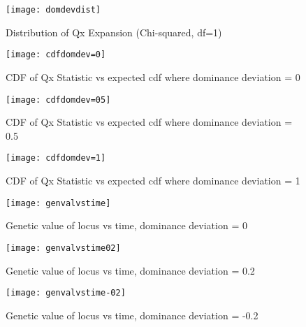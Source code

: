 \documentclass[a4paper,10pt]{article}
\begin{document}



\pagebreak

\begin{figure}
  \caption{Distribution of Qx Expansion (Chi-squared, df=1)}
  \centering
  \texttt{[image: domdevdist]}
\end{figure}

\begin{figure}
  \caption{CDF of Qx Statistic vs expected cdf where dominance
    deviation = 0}
  \centering
  \texttt{[image: cdfdomdev=0]}
\end{figure}

\begin{figure}
  \caption{CDF of Qx Statistic vs expected cdf where dominance
    deviation = 0.5}
  \centering
  \texttt{[image: cdfdomdev=05]}
\end{figure}

\begin{figure}
  \caption{CDF of Qx Statistic vs expected cdf where dominance
    deviation = 1}
  \centering
  \texttt{[image: cdfdomdev=1]}
\end{figure}

\begin{figure}
  \caption{Genetic value of locus vs time, dominance deviation = 0}
  \centering
  \texttt{[image: genvalvstime]}
\end{figure}

\begin{figure}
  \caption{Genetic value of locus vs time, dominance deviation = 0.2}
  \centering
  \texttt{[image: genvalvstime02]}
\end{figure}

\begin{figure}
  \caption{Genetic value of locus vs time, dominance deviation = -0.2}
  \centering
  \texttt{[image: genvalvstime-02]}
\end{figure}
\end{document}
